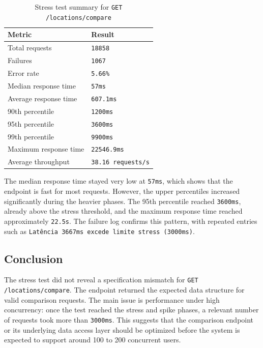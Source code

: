 \begin{table}[H]
    \centering
    \caption{Stress test summary for \texttt{GET /locations/compare}}
    \begin{tabular}{p{} p{}}
    \hline
    \textbf{Metric} & \textbf{Result} \\\hline
    Total requests & \texttt{18858} \\
    Failures & \texttt{1067} \\
    Error rate & \texttt{5.66\%} \\
    Median response time & \texttt{57ms} \\
    Average response time & \texttt{607.1ms} \\
    90th percentile & \texttt{1200ms} \\
    95th percentile & \texttt{3600ms} \\
    99th percentile & \texttt{9900ms} \\
    Maximum response time & \texttt{22546.9ms} \\
    Average throughput & \texttt{38.16 requests/s} \\\hline
    \end{tabular}
\end{table}

The median response time stayed very low at \texttt{57ms}, which shows that the endpoint is fast for most requests. However, the upper percentiles increased significantly during the heavier phases. The 95th percentile reached \texttt{3600ms}, already above the stress threshold, and the maximum response time reached approximately \texttt{22.5s}. The failure log confirms this pattern, with repeated entries such as \texttt{Latência 3667ms excede limite stress (3000ms)}.

\subsection{Conclusion}

The stress test did not reveal a specification mismatch for \texttt{GET /locations/compare}. The endpoint returned the expected data structure for valid comparison requests. The main issue is performance under high concurrency: once the test reached the stress and spike phases, a relevant number of requests took more than \texttt{3000ms}. This suggests that the comparison endpoint or its underlying data access layer should be optimized before the system is expected to support around 100 to 200 concurrent users.

